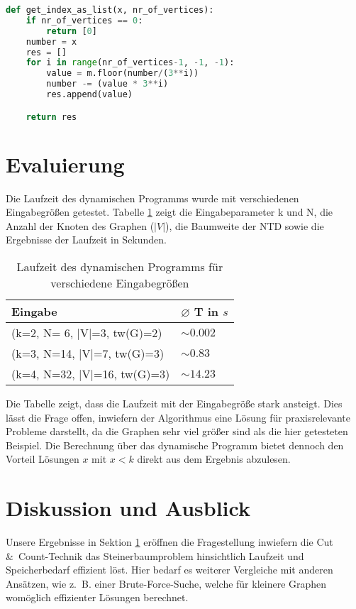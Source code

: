 \begin{svgraybox}
\begin{lstlisting}[language=python,label={code:as_list}, basicstyle=\small, caption=Funktion get\_index\_as\_list zur Berechnung der ternären Färbung aus dem Index]
def get_index_as_list(x, nr_of_vertices):
    if nr_of_vertices == 0:
        return [0]
    number = x
    res = []
    for i in range(nr_of_vertices-1, -1, -1):
        value = m.floor(number/(3**i))
        number -= (value * 3**i)
        res.append(value)

    return res
\end{lstlisting}
\end{svgraybox}

\section{Evaluierung}
\label{sec:impl_eval}
Die Laufzeit des dynamischen Programms wurde mit verschiedenen Eingabegrößen getestet. Tabelle \ref{t:eval} zeigt die Eingabeparameter k und N, die Anzahl der Knoten des Graphen ($|V|$), die Baumweite der NTD sowie die Ergebnisse der Laufzeit in Sekunden.
\begin{table}
\label{t:eval}
\centering
\begin{tabular}{l | l} 
\textbf{Eingabe} & \textbf{ $\varnothing$ T in $s$}\\
\hline
(k=2, N= 6, |V|=3, tw(G)=2) & $ \sim 0.002$ \\
(k=3, N=14, |V|=7, tw(G)=3) & $ \sim 0.83$ \\
(k=4, N=32, |V|=16, tw(G)=3) & $ \sim 14.23$ \\
\end{tabular}
\caption{Laufzeit des dynamischen Programms für verschiedene Eingabegrößen}
\end{table}

Die Tabelle zeigt, dass die Laufzeit mit der Eingabegröße stark ansteigt. Dies lässt die Frage offen, inwiefern der Algorithmus eine Lösung für praxisrelevante Probleme darstellt, da die Graphen sehr viel größer sind als die hier getesteten Beispiel. 
Die Berechnung über das dynamische Programm bietet dennoch den Vorteil Lösungen $x$ mit $x<k$ direkt aus dem Ergebnis abzulesen.

\section{Diskussion und Ausblick}
\label{sec:impl_outlook}
Unsere Ergebnisse in Sektion \ref{sec:impl_eval} eröffnen die Fragestellung inwiefern die Cut &\ Count-Technik das Steinerbaumproblem hinsichtlich Laufzeit und Speicherbedarf effizient löst. Hier bedarf es weiterer Vergleiche mit anderen Ansätzen, wie z.~B. einer Brute-Force-Suche, welche für kleinere Graphen womöglich effizienter Lösungen berechnet.

